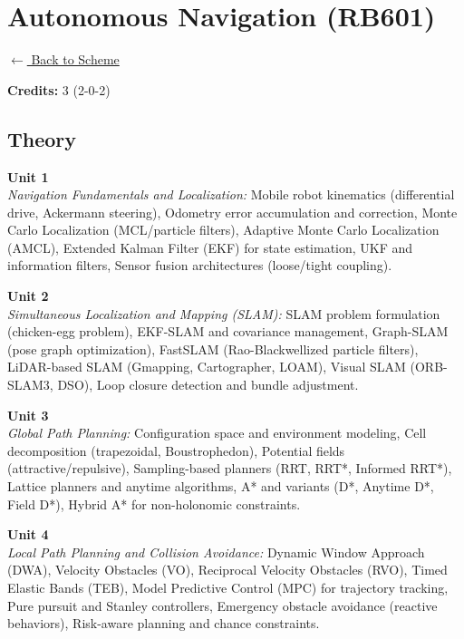 \section*{Autonomous Navigation (RB601)}
\label{major:RB_6}

\noindent \small{\hyperref[main:scheme]{$\leftarrow$ Back to Scheme}} \vspace{0.5cm}

\noindent \textbf{Credits:} 3 (2-0-2)

\subsection*{Theory}
\noindent\textbf{Unit 1} \\
\textit{Navigation Fundamentals and Localization:} Mobile robot kinematics (differential drive, Ackermann steering), Odometry error accumulation and correction, Monte Carlo Localization (MCL/particle filters), Adaptive Monte Carlo Localization (AMCL), Extended Kalman Filter (EKF) for state estimation, UKF and information filters, Sensor fusion architectures (loose/tight coupling).

\vspace{0.3cm}

\noindent\textbf{Unit 2} \\
\textit{Simultaneous Localization and Mapping (SLAM):} SLAM problem formulation (chicken-egg problem), EKF-SLAM and covariance management, Graph-SLAM (pose graph optimization), FastSLAM (Rao-Blackwellized particle filters), LiDAR-based SLAM (Gmapping, Cartographer, LOAM), Visual SLAM (ORB-SLAM3, DSO), Loop closure detection and bundle adjustment.

\vspace{0.3cm}

\noindent\textbf{Unit 3} \\
\textit{Global Path Planning:} Configuration space and environment modeling, Cell decomposition (trapezoidal, Boustrophedon), Potential fields (attractive/repulsive), Sampling-based planners (RRT, RRT*, Informed RRT*), Lattice planners and anytime algorithms, A* and variants (D*, Anytime D*, Field D*), Hybrid A* for non-holonomic constraints.

\vspace{0.3cm}

\noindent\textbf{Unit 4} \\
\textit{Local Path Planning and Collision Avoidance:} Dynamic Window Approach (DWA), Velocity Obstacles (VO), Reciprocal Velocity Obstacles (RVO), Timed Elastic Bands (TEB), Model Predictive Control (MPC) for trajectory tracking, Pure pursuit and Stanley controllers, Emergency obstacle avoidance (reactive behaviors), Risk-aware planning and chance constraints.

